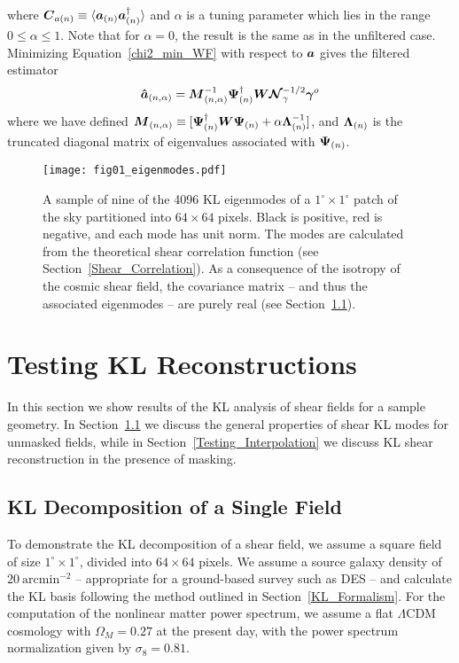where $\boldsymbol{C}_{a(n)}\equiv\langle 
\boldsymbol{a}_{(n)}\boldsymbol{a}_{(n)}^\dagger\rangle$ 
and $\alpha$ is a tuning parameter which lies in the range $0\le\alpha\le 1$. 
Note that for $\alpha=0$, the result is the same as in the unfiltered case.
Minimizing Equation~\ref{chi2_min_WF} with respect to $\boldsymbol{a}$ gives the
filtered estimator
\begin{equation}
  \label{a_WF}
  \boldsymbol{\hat{a}}_{(n,\alpha)} = 
  \boldsymbol{M}_{(n,\alpha)}^{-1} 
  \boldsymbol{\Psi}_{(n)}^\dagger \boldsymbol{W} \boldsymbol{\mathcal{N}}_\gamma^{-1/2}\boldsymbol{\gamma}^o
\end{equation}
where we have defined $\boldsymbol{M}_{(n,\alpha)} 
\equiv [\boldsymbol{\Psi}_{(n)}^\dagger\boldsymbol{W}\boldsymbol{\Psi}_{(n)} 
  + \alpha\boldsymbol{\Lambda}_{(n)}^{-1}]$, and
$\boldsymbol{\Lambda}_{(n)}$ is the truncated diagonal matrix of 
eigenvalues associated with $\boldsymbol{\Psi}_{(n)}$.

\begin{figure*}
 \centering
 \texttt{[image: fig01\_eigenmodes.pdf]} 
 \caption[ A sample of nine of the 4096 KL eigenmodes]{
   A sample of nine of the 4096 KL eigenmodes 
   of a $1^\circ\times 1^\circ$ patch of the sky partitioned into
   $64\times 64$ pixels.  Black is positive, red is negative, and each mode
   has unit norm. The modes are calculated from the theoretical
   shear correlation function (see Section~\ref{Shear_Correlation}).  
   As a consequence of the isotropy of the cosmic shear field,
   the covariance matrix -- and thus the associated eigenmodes --
   are purely real (see Section~\ref{Testing_Shear_KL}).
   \label{fig_KL_modes} }
\end{figure*} 

\section{Testing KL Reconstructions}
\label{Testing_Reconstruction}
In this section we show results of the KL analysis of shear fields for
a sample geometry.  In Section~\ref{Testing_Shear_KL} we discuss the general
properties of shear KL modes for unmasked fields, while in
Section~\ref{Testing_Interpolation} we discuss KL shear reconstruction 
in the presence of masking. 

\subsection{KL Decomposition of a Single Field}
\label{Testing_Shear_KL}
To demonstrate the KL decomposition of a shear field, we assume a square field
of size $1^\circ\times 1^\circ$, divided into $64\times 64$ pixels.  We assume
a source galaxy density of $20\ \mathrm{arcmin}^{-2}$ -- appropriate for a
ground-based survey such as DES -- and calculate the
KL basis following the method outlined in Section~\ref{KL_Formalism}.
For the computation of the nonlinear matter power spectrum, we assume a flat 
$\Lambda$CDM cosmology with $\Omega_M=0.27$ at the present day, with
the power spectrum normalization given by $\sigma_8=0.81$.

